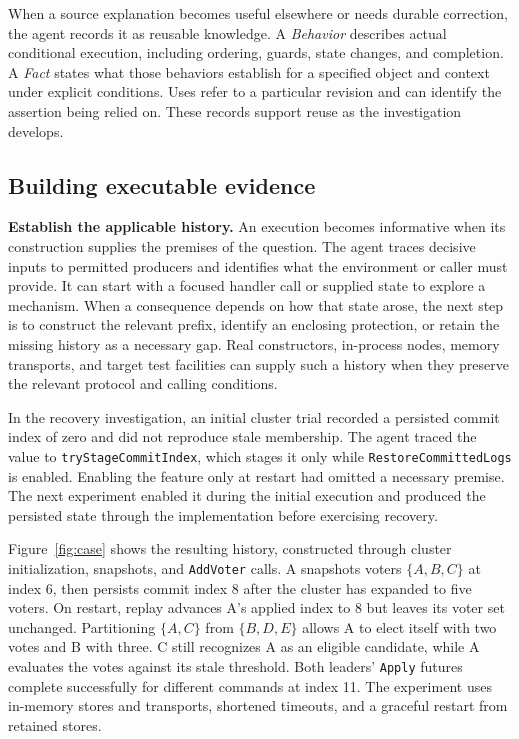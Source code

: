 \documentclass[10pt,twocolumn,letterpaper]{article}
\newcommand{\code}[1]{\texttt{#1}}
\begin{document}
When a source explanation becomes useful elsewhere or needs durable correction, the agent records it as reusable knowledge. A \emph{Behavior} describes actual conditional execution, including ordering, guards, state changes, and completion. A \emph{Fact} states what those behaviors establish for a specified object and context under explicit conditions. Uses refer to a particular revision and can identify the assertion being relied on. These records support reuse as the investigation develops.

\subsection{Building executable evidence}
\label{sec:evidence}

\textbf{Establish the applicable history.}
An execution becomes informative when its construction supplies the premises of the question. The agent traces decisive inputs to permitted producers and identifies what the environment or caller must provide. It can start with a focused handler call or supplied state to explore a mechanism. When a consequence depends on how that state arose, the next step is to construct the relevant prefix, identify an enclosing protection, or retain the missing history as a necessary gap. Real constructors, in-process nodes, memory transports, and target test facilities can supply such a history when they preserve the relevant protocol and calling conditions.

In the recovery investigation, an initial cluster trial recorded a persisted commit index of zero and did not reproduce stale membership. The agent traced the value to \code{tryStageCommitIndex}, which stages it only while \code{RestoreCommittedLogs} is enabled. Enabling the feature only at restart had omitted a necessary premise. The next experiment enabled it during the initial execution and produced the persisted state through the implementation before exercising recovery.

Figure~\ref{fig:case} shows the resulting history, constructed through cluster initialization, snapshots, and \code{AddVoter} calls. A snapshots voters $\{A,B,C\}$ at index 6, then persists commit index 8 after the cluster has expanded to five voters. On restart, replay advances A's applied index to 8 but leaves its voter set unchanged. Partitioning $\{A,C\}$ from $\{B,D,E\}$ allows A to elect itself with two votes and B with three. C still recognizes A as an eligible candidate, while A evaluates the votes against its stale threshold. Both leaders' \code{Apply} futures complete successfully for different commands at index 11. The experiment uses in-memory stores and transports, shortened timeouts, and a graceful restart from retained stores.
\end{document}
